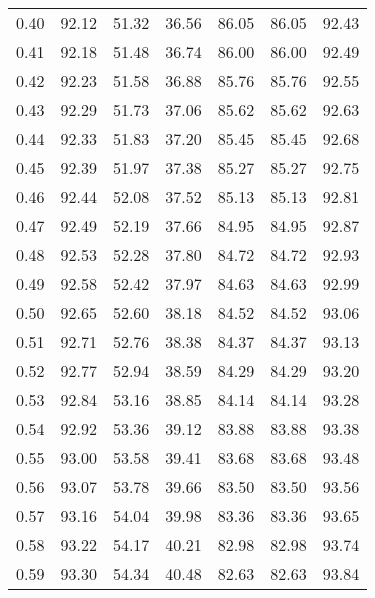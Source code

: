 \begin{tabular}{|c|c|c|c|c|c|c|}
      0.40 &     92.12 &     51.32 &      36.56 &   86.05 &      86.05 &         92.43 \\
      0.41 &     92.18 &     51.48 &      36.74 &   86.00 &      86.00 &         92.49 \\
      0.42 &     92.23 &     51.58 &      36.88 &   85.76 &      85.76 &         92.55 \\
      0.43 &     92.29 &     51.73 &      37.06 &   85.62 &      85.62 &         92.63 \\
      0.44 &     92.33 &     51.83 &      37.20 &   85.45 &      85.45 &         92.68 \\
      0.45 &     92.39 &     51.97 &      37.38 &   85.27 &      85.27 &         92.75 \\
      0.46 &     92.44 &     52.08 &      37.52 &   85.13 &      85.13 &         92.81 \\
      0.47 &     92.49 &     52.19 &      37.66 &   84.95 &      84.95 &         92.87 \\
      0.48 &     92.53 &     52.28 &      37.80 &   84.72 &      84.72 &         92.93 \\
      0.49 &     92.58 &     52.42 &      37.97 &   84.63 &      84.63 &         92.99 \\
      0.50 &     92.65 &     52.60 &      38.18 &   84.52 &      84.52 &         93.06 \\
      0.51 &     92.71 &     52.76 &      38.38 &   84.37 &      84.37 &         93.13 \\
      0.52 &     92.77 &     52.94 &      38.59 &   84.29 &      84.29 &         93.20 \\
      0.53 &     92.84 &     53.16 &      38.85 &   84.14 &      84.14 &         93.28 \\
      0.54 &     92.92 &     53.36 &      39.12 &   83.88 &      83.88 &         93.38 \\
      0.55 &     93.00 &     53.58 &      39.41 &   83.68 &      83.68 &         93.48 \\
      0.56 &     93.07 &     53.78 &      39.66 &   83.50 &      83.50 &         93.56 \\
      0.57 &     93.16 &     54.04 &      39.98 &   83.36 &      83.36 &         93.65 \\
      0.58 &     93.22 &     54.17 &      40.21 &   82.98 &      82.98 &         93.74 \\
      0.59 &     93.30 &     54.34 &      40.48 &   82.63 &      82.63 &         93.84 \\

\end{tabular}
